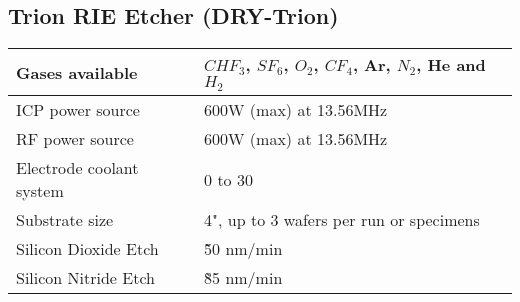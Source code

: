 \subsection{Trion RIE Etcher (DRY-Trion)}\label{trion_RIE_etch_machine}
\WaferSemiClean

\begin{minipage}[H]{\MachinePictureMiniPageWidth}
\end{minipage}\begin{minipage}[H]{\MachineTextMiniPageWidth}
	\begin{tabular}{|p{4cm}|p{7cm}|}
		\hline
		Gases available &
		$CHF_3$, $SF_6$, $O_2$, $CF_4$, Ar, $N_2$, He and $H_2$ \\
		\hline
		ICP power source &
		600W (max) at 13.56MHz \\
		\hline
		RF power source &
		600W (max) at 13.56MHz \\
		\hline
		Electrode coolant system &
		0 to 30\degreesC \\
		\hline
		Substrate size &
		4", up to 3 wafers per run or specimens \\
		\hline
		Silicon Dioxide Etch &
		\~ 50 nm/min \\
		\hline
		Silicon Nitride Etch &
		\~ 85 nm/min \\
		\hline
	\end{tabular}
\end{minipage}

